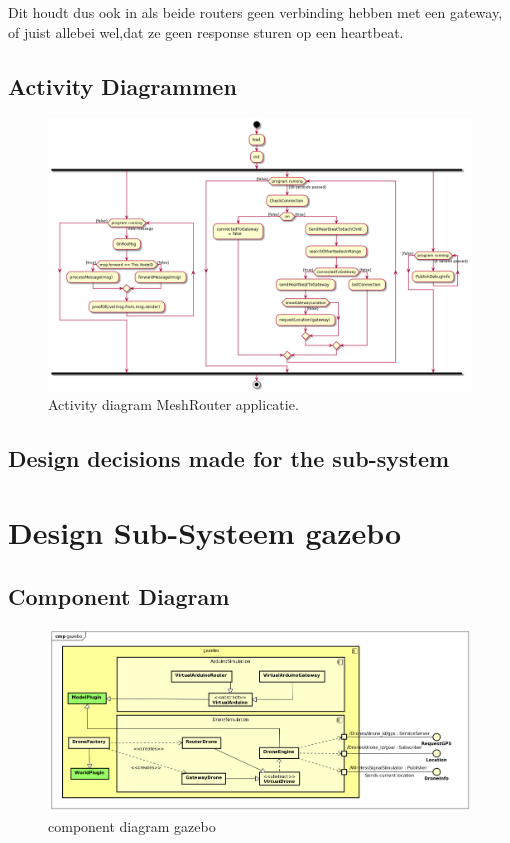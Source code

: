\documentclass[a4paper, 11pt, oneside]{report}
\begin{document}
Dit houdt dus ook in als beide routers geen verbinding hebben met een gateway, of juist allebei wel,dat ze geen response sturen op een heartbeat.


\subsection{Activity Diagrammen}
\label{DetailedDesign:Communicatie:Activity}

\begin{figure}[H]
	\begin{center}\includegraphics[width=\linewidth]{UML/out/Communication/activity/MeshRouter/MeshRouter.png}\end{center}
	\caption{Activity diagram MeshRouter applicatie.}
	\label{fig:communication:activity:meshcommunicator}
\end{figure}


\subsection{Design decisions made for the sub-system}

\section{Design Sub-Systeem gazebo}
\label{DetailedDesign:MeshNetwerk}
\subsection{Component Diagram}
\label{DetailedDesign:MeshNetwerk:ComponentDiagram}
\begin{figure}[H]
	\begin{center}\includegraphics[width=\linewidth]{Afbeeldingen/gazeboComponentDiagram.png}\end{center}
	\caption{component diagram gazebo}
	\label{fig:component:gazebo}
\end{figure}
\end{document}
